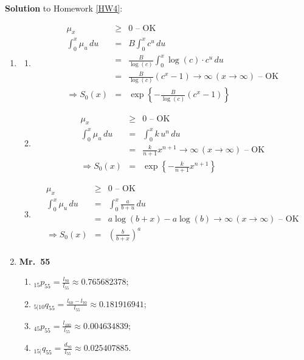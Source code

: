 \documentclass[11pt,fleqn,oneside]{book}
\begin{document}
\noindent \textbf{Solution} to Homework \ref{HW4}:
\footnotesize  
\begin{enumerate}
\item
\begin{enumerate}
\item 
\begin{eqnarray*}
\mu_x &\geq& 0 \text{ -- OK} \\
\int_{0}^x \mu_u\,du &=& B \int_0^x c^u\,du \\
&=& \frac{B}{\log(c)} \int_0^x \log(c)\cdot c^u\,du \\
&=& \frac{B}{\log(c)} (c^x - 1) \rightarrow \infty\, (x \rightarrow \infty) \text{ -- OK} \\
\Rightarrow S_0(x) &=& \exp\left\{ - \frac{B}{\log(c)} (c^x - 1)\right\}
\end{eqnarray*}
\item
\begin{eqnarray*}
\mu_x &\geq& 0 \text{ -- OK} \\
\int_{0}^x \mu_u\,du &=& \int_0^x k\,u^n\,du \\
&=& \frac{k}{n+1} x^{n+1} \rightarrow \infty\, (x \rightarrow \infty) \text{ -- OK} \\
\Rightarrow S_0(x) &=& \exp\left\{ - \frac{k}{n+1} x^{n+1}\right\}
\end{eqnarray*}
\item
\begin{eqnarray*}
\mu_x &\geq& 0 \text{ -- OK} \\
\int_{0}^x \mu_u\,du &=& \int_0^x \frac{a}{b+u}\,du \\
&=& a\log(b+x) - a \log(b) 
\rightarrow \infty\, (x \rightarrow \infty) \text{ -- OK} \\
\Rightarrow S_0(x) &=& \left(\frac{b}{b+x}\right)^a\\
\end{eqnarray*}
\end{enumerate}
\item \textbf{Mr.\ 55}
\begin{enumerate}
\item ${_{15}p_{55}} = \frac{l_{70}}{l_{55}} \approx 0.765682378; $
\item ${_{5|10}q_{55}} = \frac{l_{60} - l_{70}}{l_{55}} \approx 0.181916941;$
\item ${_{45}p_{55}} = \frac{l_{100}}{l_{55}} \approx 0.004634839;$
\item ${_{15|}q_{55}} = \frac{d_{70}}{l_{55}} \approx 0.025407885$.
\end{enumerate}
\end{enumerate}
\end{document}
